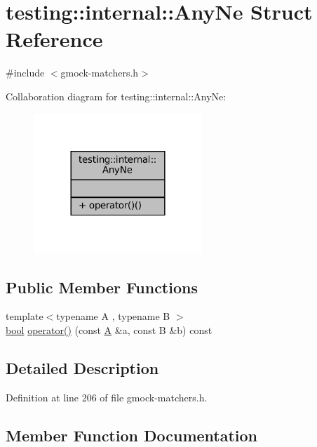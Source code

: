 \hypertarget{structtesting_1_1internal_1_1AnyNe}{}\section{testing\+:\+:internal\+:\+:Any\+Ne Struct Reference}
\label{structtesting_1_1internal_1_1AnyNe}


{\ttfamily \#include $<$gmock-\/matchers.\+h$>$}



Collaboration diagram for testing\+:\+:internal\+:\+:Any\+Ne\+:
\nopagebreak
\begin{figure}[H]
\begin{center}
\leavevmode
\includegraphics[width=180pt]{structtesting_1_1internal_1_1AnyNe__coll__graph}
\end{center}
\end{figure}
\subsection*{Public Member Functions}
\begin{DoxyCompactItemize}
\item 
{\footnotesize template$<$typename A , typename B $>$ }\\\hyperlink{classbool}{bool} \hyperlink{structtesting_1_1internal_1_1AnyNe_a9f50f8ede12e394c6bc64bad05e94742}{operator()} (const \hyperlink{namespacetesting_a5e9134d655d2fc9323902348083282e7}{A} \&a, const B \&b) const
\end{DoxyCompactItemize}


\subsection{Detailed Description}


Definition at line 206 of file gmock-\/matchers.\+h.



\subsection{Member Function Documentation}
\mbox{\label{structtesting_1_1internal_1_1AnyNe_a9f50f8ede12e394c6bc64bad05e94742}} 
